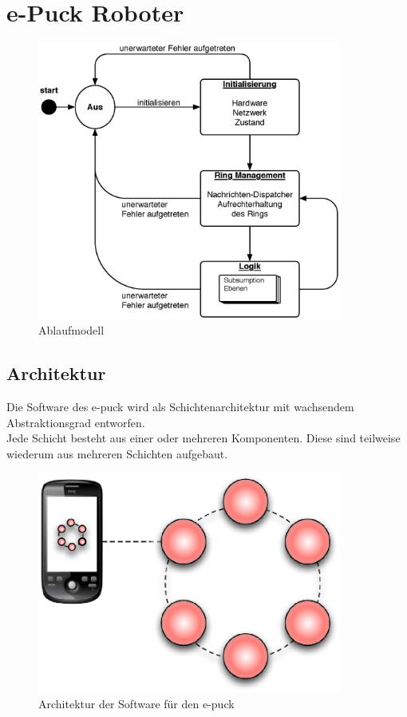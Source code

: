 \documentclass[10pt,a4paper]{article}
\let\oldsection\section
\renewcommand{\section}{\newpage \oldsection}
\begin{document}
	\section{e-Puck Roboter}
		
		\begin{figure}[h]
			\centering
			\includegraphics[width=10cm]{images/e-puck.eps}
  			\caption{Ablaufmodell}
  		\end{figure}
  				
		\subsection{Architektur}
		Die Software des e-puck wird als Schichtenarchitektur mit wachsendem Abstraktionsgrad entworfen. \\
		Jede Schicht besteht aus einer oder mehreren Komponenten. Diese sind teilweise wiederum aus mehreren
		Schichten aufgebaut. \\
		
		\begin{figure}[h]
			\centering
			\includegraphics[width=10cm]{images/system.eps}
  			\caption{Architektur der Software für den e-puck}
  		\end{figure}
		
\end{document}
